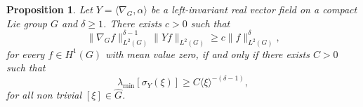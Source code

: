 \documentclass[11pt]{amsart}
\numberwithin{theorem}{section}
\numberwithin{equation}{section}
\newtheorem{prop}[theorem]{Proposition}
\theoremstyle{definition}
\numberwithin{example}{section}
\theoremstyle{definition}
\theoremstyle{definition}
\begin{document}
\begin{prop}\label{prop_necessary}
     Let $Y=\langle \nabla_{G},\alpha\rangle$ be a left-invariant real vector field on a compact Lie group $G$ and $\delta\geq 1$. There exists $c>0$ such that 
    \begin{equation}\label{ineq_poincare_necessary}
        \|\nabla_{G} f\|_{L^2(G)}^{\delta-1}\| Yf\|_{L^2(G)}\geq c\|f\|_{L^2(G)}^\delta,
    \end{equation}
    for every $f\in H^1(G)$ with mean value zero, if and only if there exists $C>0$ such that
    \begin{equation}\label{ineq_necessary}
        \lambda_{\min}[\sigma_Y(\xi)]\geq C\langle \xi \rangle^{-(\delta-1)},
    \end{equation}
    for all non trivial $[\xi]\in\widehat{G}$. 
\end{prop}
\end{document}
